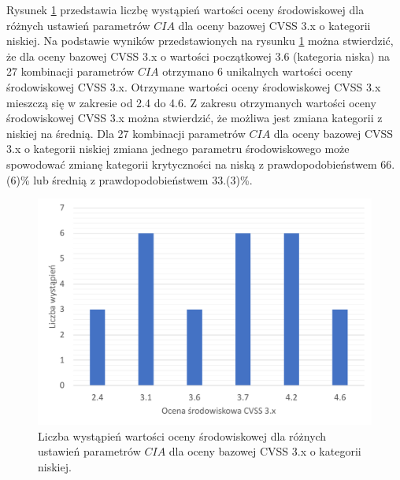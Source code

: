 \bigbreak
Rysunek \ref{fig:wplyw:env_a:cvss_3_low} przedstawia liczbę wystąpień wartości oceny środowiskowej dla różnych ustawień parametrów $CIA$ dla oceny bazowej CVSS 3.x o kategorii niskiej. Na podstawie wyników przedstawionych na rysunku \ref{fig:wplyw:env_a:cvss_3_low} można stwierdzić, że dla oceny bazowej CVSS 3.x o wartości początkowej 3.6 (kategoria niska) na 27 kombinacji parametrów $CIA$ otrzymano 6 unikalnych wartości oceny środowiskowej CVSS 3.x. Otrzymane wartości oceny środowiskowej CVSS 3.x mieszczą się w zakresie od 2.4 do 4.6. Z zakresu otrzymanych wartości oceny środowiskowej CVSS 3.x można stwierdzić, że możliwa jest zmiana kategorii z niskiej na średnią. Dla 27 kombinacji parametrów $CIA$ dla oceny bazowej CVSS 3.x o kategorii niskiej zmiana jednego parametru środowiskowego może spowodować zmianę kategorii krytyczności na niską z prawdopodobieństwem 66.(6)\% lub średnią z prawdopodobieństwem 33.(3)\%.

\begin{figure}[!ht]
\centering
\includegraphics[width=.9\textwidth]{Chapters/Wplyw/cvss3/cvss_3_low.pdf}
\caption{Liczba wystąpień wartości oceny środowiskowej dla różnych ustawień parametrów $CIA$ dla oceny bazowej CVSS 3.x o kategorii niskiej.}
\label{fig:wplyw:env_a:cvss_3_low}
\end{figure}

